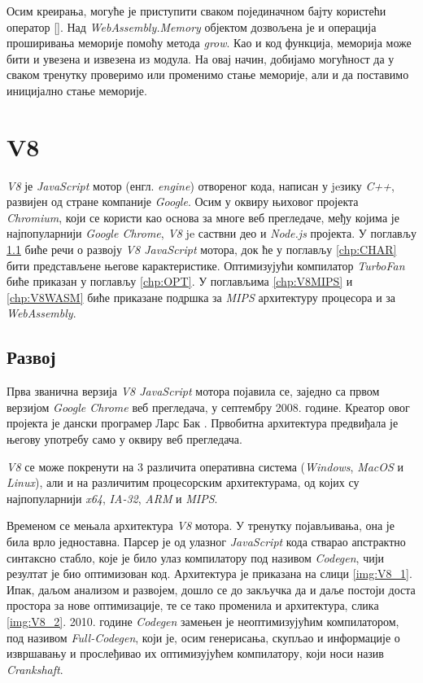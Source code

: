 \documentclass[12pt,oneside]{memoir}
\begin{document}
Осим креирања, могуће је приступити сваком појединачном бајту користећи оператор []. Над \textit{WebAssembly.Memory}
објектом дозвољена је и операција проширивања меморије помоћу метода \textit{grow}. Као и код функција, меморија може бити и увезена и извезена из модула.
На овај начин, добијамо могућност да у сваком тренутку проверимо или променимо стање меморије, али и да поставимо иницијално стање меморије.

\chapter{V8}

\textit{V8} је \textit{JavaScript} мотор (енгл. \textit{engine}) отвореног кода, написан у jeзику \textit{C++},
развијен од стране компаније \textit{Google}. Осим у оквиру њиховог пројекта \textit{Chromium}, који се користи као основа за многе веб прегледаче,
међу којима је најпопуларнији \textit{Google Chrome}, \textit{V8} je саствни део и \textit{Node.js} пројекта. У поглављу \ref{chp:DEV} биће речи о развоју
\textit{V8 JavaScript} мотора, док ће у поглављу \ref{chp:CHAR} бити представљене његове карактеристике. Оптимизујући компилатор \textit{TurboFan}
биће приказан у поглављу \ref{chp:OPT}. У поглављима \ref{chp:V8MIPS} и \ref{chp:V8WASM} биће приказане подршка за \textit{MIPS} архитектуру процесора
и за \textit{WebAssembly}.

\section{Развој} \label{chp:DEV}

Прва званична верзија \textit{V8 JavaScript} мотора појавила се, заједно са првом верзијом \textit{Google Chrome} веб прегледача, у септембру 2008. године. Креатор
овог пројекта је дански програмер Ларс Бак \cite{V8SP}. Првобитна архитектура предвиђала је његову употребу само у оквиру веб прегледача.

\textit{V8} се може покренути на 3 различита оперативна система (\textit{Windows}, \textit{MacOS} и \textit{Linux}), али и на различитим процесорским архитектурама, од којих
су најпопуларнији \textit{x64}, \textit{IA-32}, \textit{ARM} и \textit{MIPS}.

Временом се мењала архитектура \textit{V8} мотора. У тренутку појављивања, она је била врло једноставна. Парсер је од улазног \textit{JavaScript} кода стварао апстрактно
синтаксно стабло, које је било улаз компилатору под називом \textit{Codegen}, чији резултат је био оптимизован код. Архитектура је приказана на слици \ref{img:V8_1}.
Ипак, даљом анализом и развојем, дошло се до закључка да и даље постоји доста простора за нове оптимизације, те се тако променила и архитектура, слика \ref{img:V8_2}.
2010. године \textit{Codegen} замењен је неоптимизујућим компилатором, под називом \textit{Full-Codegen}, који је, осим генерисања, скупљао и информације о извршавању и
прослеђивао их оптимизујућем компилатору, који носи назив \textit{Crankshaft}.
\end{document}
